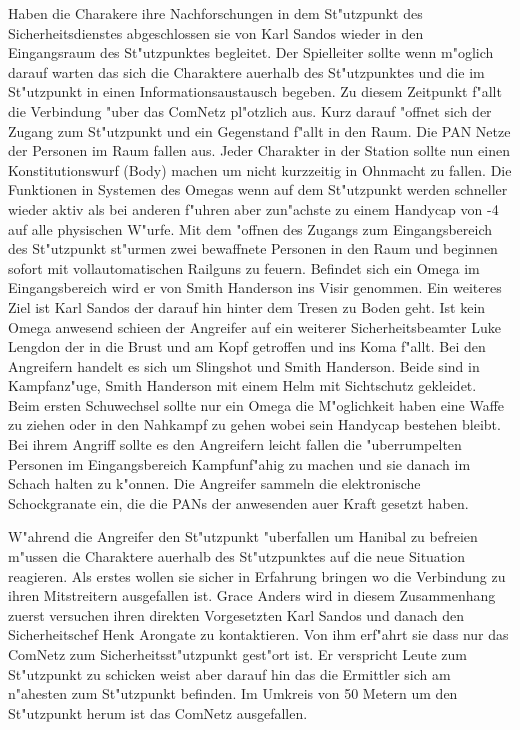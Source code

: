 Haben die Charakere ihre Nachforschungen in dem St"utzpunkt des Sicherheitsdienstes abgeschlossen sie von Karl Sandos wieder in den Eingangsraum des St"utzpunktes begleitet. Der Spielleiter sollte wenn m"oglich darauf warten das sich die Charaktere au\3erhalb des St"utzpunktes und die im St"utzpunkt in einen Informationsaustausch begeben. Zu diesem Zeitpunkt f"allt die Verbindung "uber das ComNetz pl"otzlich aus. Kurz darauf "offnet sich der Zugang zum St"utzpunkt und ein Gegenstand f"allt in den Raum. Die PAN Netze der Personen im Raum fallen aus. Jeder Charakter in der Station sollte nun einen Konstitutionswurf (Body) machen um nicht kurzzeitig in Ohnmacht zu fallen. Die Funktionen in Systemen des Omegas wenn auf dem St"utzpunkt werden schneller wieder aktiv als bei anderen f"uhren aber zun"achste zu einem Handycap von -4 auf alle physischen W"urfe. Mit dem "offnen des Zugangs zum Eingangsbereich des St"utzpunkt st"urmen zwei bewaffnete Personen in den Raum und beginnen sofort mit vollautomatischen Railguns zu feuern. Befindet sich ein Omega im Eingangsbereich wird er von
Smith Handerson ins Visir genommen. Ein weiteres Ziel ist Karl Sandos der darauf hin hinter dem Tresen zu Boden geht. Ist kein Omega anwesend schie\3en der Angreifer auf ein weiterer Sicherheitsbeamter Luke Lengdon der in die Brust und am Kopf getroffen und ins Koma f"allt. Bei den Angreifern handelt es sich um Slingshot und Smith Handerson. Beide sind in Kampfanz"uge, Smith Handerson mit einem Helm mit Sichtschutz gekleidet. Beim ersten Schu\3wechsel sollte nur ein Omega die M"oglichkeit haben eine Waffe zu ziehen oder in den Nahkampf zu gehen wobei sein Handycap bestehen bleibt. Bei ihrem Angriff sollte es den Angreifern leicht fallen die "uberrumpelten Personen im Eingangsbereich Kampfunf"ahig zu machen und sie danach im Schach halten zu k"onnen. Die Angreifer sammeln die elektronische Schockgranate ein, die die PANs der anwesenden au\3er Kraft gesetzt haben.

W"ahrend die Angreifer den St"utzpunkt "uberfallen um Hanibal zu befreien m"ussen die Charaktere au\3erhalb des St"utzpunktes auf die neue Situation reagieren. Als erstes wollen sie sicher in Erfahrung bringen wo die Verbindung zu ihren Mitstreitern ausgefallen ist. Grace Anders wird in diesem Zusammenhang zuerst versuchen ihren direkten Vorgesetzten Karl Sandos und danach den Sicherheitschef Henk Arongate zu kontaktieren. Von ihm erf"ahrt sie dass nur das ComNetz zum Sicherheitsst"utzpunkt gest"ort ist. Er verspricht Leute zum St"utzpunkt zu schicken weist aber darauf hin das die Ermittler sich am n"ahesten zum St"utzpunkt befinden. Im Umkreis von 50 Metern um den St"utzpunkt herum ist das ComNetz ausgefallen. 

